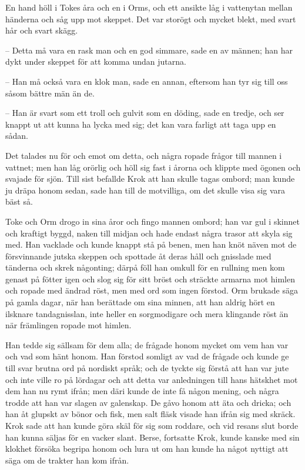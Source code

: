 \initial En hand höll i Tokes åra och en i Orms, och ett ansikte låg i vattenytan mellan händerna och såg upp mot skeppet. Det var storögt och mycket blekt, med svart hår och svart skägg.

– Detta må vara en rask man och en god simmare, sade en av männen; han har dykt under skeppet för att komma undan jutarna.

– Han må också vara en klok man, sade en annan, eftersom han tyr sig till oss såsom bättre män än de.

– Han är svart som ett troll och gulvit som en döding, sade en tredje, och ser knappt ut att kunna ha lycka med sig; det kan vara farligt att taga upp en sådan.

\initial Det talades nu för och emot om detta, och några ropade frågor till mannen i vattnet; men han låg orörlig och höll sig fast i årorna och klippte med ögonen och svajade för sjön. Till sist befallde Krok att han skulle tagas ombord; man kunde ju dräpa honom sedan, sade han till de motvilliga, om det skulle visa sig vara bäst så.

\initial Toke och Orm drogo in sina åror och fingo mannen ombord; han var gul i skinnet och kraftigt byggd, naken till midjan och hade endast några trasor att skyla sig med. Han vacklade och kunde knappt stå på benen, men han knöt näven mot de försvinnande jutska skeppen och spottade åt deras håll och gnisslade med tänderna och skrek någonting; därpå föll han omkull för en rullning men kom genast på fötter igen och slog sig för sitt bröst och sträckte armarna mot himlen och ropade med ändrad röst, men med ord som ingen förstod. Orm brukade säga på gamla dagar, när han berättade om sina minnen, att han aldrig hört en ilsknare tandagnisslan, inte heller en sorgmodigare och mera klingande röst än när främlingen ropade mot himlen.

\initial Han tedde sig sällsam för dem alla; de frågade honom mycket om vem han var och vad som hänt honom. Han förstod somligt av vad de frågade och kunde ge till svar brutna ord på nordiskt språk; och de tyckte sig förstå att han var jute och inte ville ro på lördagar och att detta var anledningen till hans hätskhet mot dem han nu rymt ifrån; men däri kunde de inte få någon mening, och några trodde att han var slagen av galenskap. De gåvo honom att äta och dricka; och han åt glupskt av bönor och fisk, men salt fläsk visade han ifrån sig med skräck. Krok sade att han kunde göra skäl för sig som roddare, och vid resans slut borde han kunna säljas för en vacker slant. Berse, fortsatte Krok, kunde kanske med sin klokhet försöka begripa honom och lura ut om han kunde ha något nyttigt att säga om de trakter han kom ifrån.


